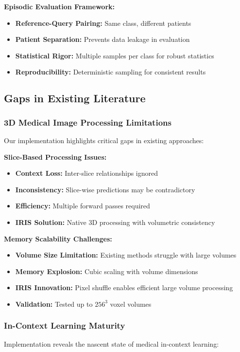 \textbf{Episodic Evaluation Framework:}
\begin{itemize}
    \item \textbf{Reference-Query Pairing:} Same class, different patients
    \item \textbf{Patient Separation:} Prevents data leakage in evaluation
    \item \textbf{Statistical Rigor:} Multiple samples per class for robust statistics
    \item \textbf{Reproducibility:} Deterministic sampling for consistent results
\end{itemize}

\subsection{Gaps in Existing Literature}

\subsubsection*{3D Medical Image Processing Limitations}
Our implementation highlights critical gaps in existing approaches:

\textbf{Slice-Based Processing Issues:}
\begin{itemize}
    \item \textbf{Context Loss:} Inter-slice relationships ignored
    \item \textbf{Inconsistency:} Slice-wise predictions may be contradictory
    \item \textbf{Efficiency:} Multiple forward passes required
    \item \textbf{IRIS Solution:} Native 3D processing with volumetric consistency
\end{itemize}

\textbf{Memory Scalability Challenges:}
\begin{itemize}
    \item \textbf{Volume Size Limitation:} Existing methods struggle with large volumes
    \item \textbf{Memory Explosion:} Cubic scaling with volume dimensions
    \item \textbf{IRIS Innovation:} Pixel shuffle enables efficient large volume processing
    \item \textbf{Validation:} Tested up to $256^3$ voxel volumes
\end{itemize}

\subsubsection*{In-Context Learning Maturity}
Implementation reveals the nascent state of medical in-context learning:

